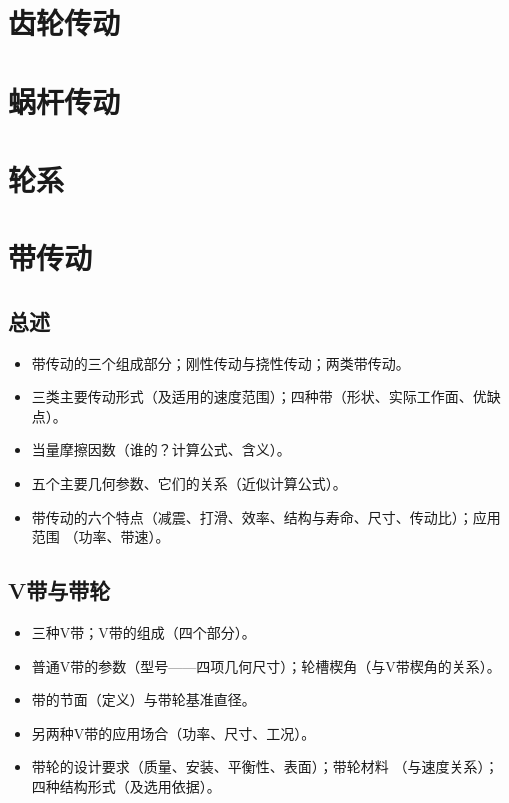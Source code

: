 \documentclass[12pt,a4paper]{article}
\newcommand{\tightlist}{\setlength{\parskip}{0pt}\setlength{\itemsep}{0pt}}
\newcommand{\hint}[1]{\textsf{（#1）}}
\newcommand{\minor}[1]{{\color{gray} #1}}
\begin{document}
\section{齿轮传动}

\section{蜗杆传动}

\section{轮系}

\section{带传动}
\subsection{总述}
\begin{itemize}\tightlist
    \item 带传动的三个组成部分；刚性传动与挠性传动；两类带传动。
    \item 三类主要传动形式\hint{及适用的速度范围}；四种带\hint{形状、实际工作面、优缺点}。
    \item 当量摩擦因数\hint{谁的？计算公式、含义}。
    \item 五个主要几何参数、它们的关系\hint{近似计算公式}。
    \item 带传动的六个特点\hint{减震、打滑、效率、结构与寿命、尺寸、传动比}；应用范围
    \hint{功率、带速}。
\end{itemize}

\subsection{V带与带轮}
\begin{itemize}\tightlist
    \item 三种V带；V带的组成\hint{四个部分}。
    \item 普通V带的参数\hint{型号——四项几何尺寸}；轮槽楔角\hint{与V带楔角的关系}。
    \item 带的节面\hint{定义}与带轮基准直径。
    \item \minor{另两种V带的应用场合\hint{功率、尺寸、工况}。}
    \item \minor{带轮的设计要求\hint{质量、安装、平衡性、表面}；}带轮材料
    \hint{与速度关系}；\minor{四种结构形式\hint{及选用依据}。}
\end{itemize}
\end{document}
